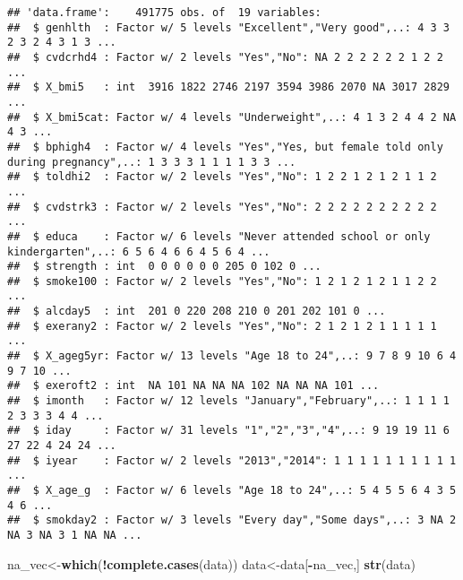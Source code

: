 \documentclass[
]{article}
\newenvironment{Shaded}{\begin{snugshade}}{\end{snugshade}}
\newcommand{\KeywordTok}[1]{\textcolor[rgb]{0.13,0.29,0.53}{\textbf{#1}}}
\newcommand{\NormalTok}[1]{#1}
\newcommand{\OperatorTok}[1]{\textcolor[rgb]{0.81,0.36,0.00}{\textbf{#1}}}
\begin{document}
\begin{verbatim}
## 'data.frame':    491775 obs. of  19 variables:
##  $ genhlth  : Factor w/ 5 levels "Excellent","Very good",..: 4 3 3 2 3 2 4 3 1 3 ...
##  $ cvdcrhd4 : Factor w/ 2 levels "Yes","No": NA 2 2 2 2 2 2 1 2 2 ...
##  $ X_bmi5   : int  3916 1822 2746 2197 3594 3986 2070 NA 3017 2829 ...
##  $ X_bmi5cat: Factor w/ 4 levels "Underweight",..: 4 1 3 2 4 4 2 NA 4 3 ...
##  $ bphigh4  : Factor w/ 4 levels "Yes","Yes, but female told only during pregnancy",..: 1 3 3 3 1 1 1 1 3 3 ...
##  $ toldhi2  : Factor w/ 2 levels "Yes","No": 1 2 2 1 2 1 2 1 1 2 ...
##  $ cvdstrk3 : Factor w/ 2 levels "Yes","No": 2 2 2 2 2 2 2 2 2 2 ...
##  $ educa    : Factor w/ 6 levels "Never attended school or only kindergarten",..: 6 5 6 4 6 6 4 5 6 4 ...
##  $ strength : int  0 0 0 0 0 0 205 0 102 0 ...
##  $ smoke100 : Factor w/ 2 levels "Yes","No": 1 2 1 2 1 2 1 1 2 2 ...
##  $ alcday5  : int  201 0 220 208 210 0 201 202 101 0 ...
##  $ exerany2 : Factor w/ 2 levels "Yes","No": 2 1 2 1 2 1 1 1 1 1 ...
##  $ X_ageg5yr: Factor w/ 13 levels "Age 18 to 24",..: 9 7 8 9 10 6 4 9 7 10 ...
##  $ exeroft2 : int  NA 101 NA NA NA 102 NA NA NA 101 ...
##  $ imonth   : Factor w/ 12 levels "January","February",..: 1 1 1 1 2 3 3 3 4 4 ...
##  $ iday     : Factor w/ 31 levels "1","2","3","4",..: 9 19 19 11 6 27 22 4 24 24 ...
##  $ iyear    : Factor w/ 2 levels "2013","2014": 1 1 1 1 1 1 1 1 1 1 ...
##  $ X_age_g  : Factor w/ 6 levels "Age 18 to 24",..: 5 4 5 5 6 4 3 5 4 6 ...
##  $ smokday2 : Factor w/ 3 levels "Every day","Some days",..: 3 NA 2 NA 3 NA 3 1 NA NA ...
\end{verbatim}

\begin{Shaded}
\begin{Highlighting}[]
\NormalTok{na_vec<-}\KeywordTok{which}\NormalTok{(}\OperatorTok{!}\KeywordTok{complete.cases}\NormalTok{(data))}
\NormalTok{data<-data[}\OperatorTok{-}\NormalTok{na_vec,]}
\KeywordTok{str}\NormalTok{(data)}
\end{Highlighting}
\end{Shaded}
\end{document}
